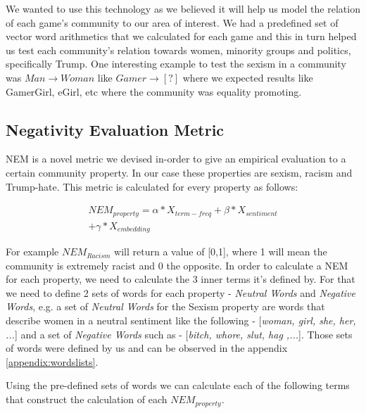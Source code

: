 We wanted to use this technology as we believed it will help us model the relation of each game's community to our area of interest. We had a predefined set of vector word arithmetics that we calculated for each game and this in turn helped us test each community's relation towards women, minority groups and politics, specifically Trump.
One interesting example to test the sexism in a community was $Man \rightarrow Woman$ like $Gamer \rightarrow  [ ? ] $
where we expected results like GamerGirl, eGirl, etc where the community was equality promoting.


\subsection{Negativity Evaluation Metric}
NEM is a novel metric we devised in-order to give an empirical evaluation to a certain community property. In our case these properties are sexism, racism and Trump-hate.
This metric is calculated for every property as follows:

\begin{multline*} 
     NEM_{property} = \alpha*X_{term-freq} + \beta*X_{sentiment} \\ 
     + \gamma*X_{embedding}
\end{multline*}

For example $NEM_{Racism}$ will return a value of [0,1], where 1 will mean the community is extremely racist and 0 the opposite.
In order to calculate a NEM for each property, we need to calculate the 3 inner terms it's defined by. For that we need to define 2 sets of words for each property - \emph{Neutral Words} and \emph{Negative Words}, e.g. a set of \emph{Neutral Words} for the Sexism property are words that describe women in a neutral sentiment like the following - [\emph{woman, girl, she, her, ...}] and a set of \emph{Negative Words} such as - [\emph{bitch, whore, slut, hag ,...}]. Those sets of words were defined by us and can be observed in the appendix \ref{appendix:wordslists}.
\vspace{1mm}

Using the pre-defined sets of words we can calculate each of the following terms that construct the calculation of each $NEM_{property}$.
\vspace{1mm}

